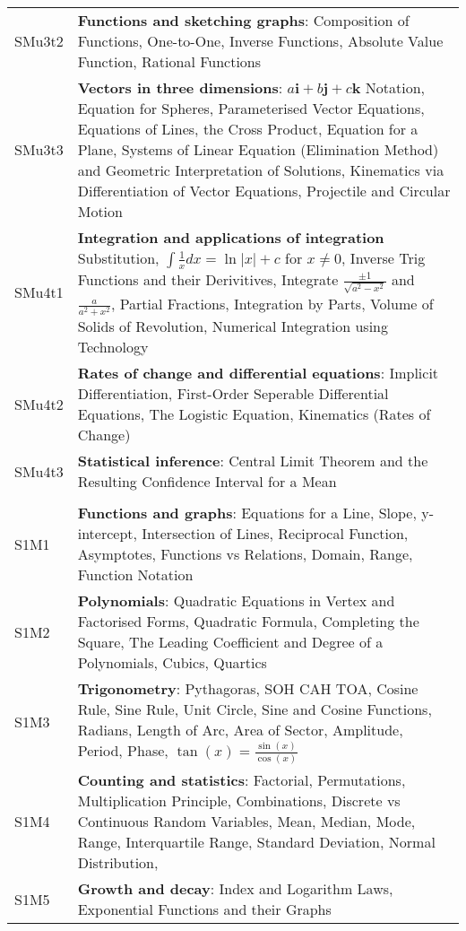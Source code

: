 \documentclass[varwidth=144mm, 12pt]{standalone}
\begin{document}
\begin{longtable}{lp{}}
SMu3t2 & \textbf{Functions and sketching graphs}: Composition of Functions, One-to-One, Inverse Functions, Absolute Value Function, Rational Functions \\
SMu3t3 & \textbf{Vectors in three dimensions}: $a\textbf{i} + b\textbf{j} + c\textbf{k}$ Notation, Equation for Spheres, Parameterised Vector Equations, Equations of Lines, the Cross Product, Equation for a Plane, Systems of Linear Equation (Elimination Method) and Geometric Interpretation of Solutions, Kinematics via Differentiation of Vector Equations, Projectile and Circular Motion \\
SMu4t1 & \textbf{Integration and applications of integration} Substitution, $\int{\frac{1}{x}dx} = \ln{|x|} + c$ for $x \neq 0$, Inverse Trig Functions and their Derivitives, Integrate $\frac{\pm1}{\sqrt{a^2-x^2}}$ and $\frac{a}{a^2 + x^2}$, Partial Fractions, Integration by Parts, Volume of Solids of Revolution, Numerical Integration using Technology \\
SMu4t2 & \textbf{Rates of change and differential equations}: Implicit Differentiation, First-Order Seperable Differential Equations, The Logistic Equation, Kinematics (Rates of Change) \\
SMu4t3 & \textbf{Statistical inference}: Central Limit Theorem and the Resulting Confidence Interval for a Mean \\
& \\
S1M1 & \textbf{Functions and graphs}: Equations for a Line, Slope, y-intercept, Intersection of Lines, Reciprocal Function, Asymptotes, Functions vs Relations, Domain, Range, Function Notation \\
S1M2 & \textbf{Polynomials}: Quadratic Equations in Vertex and Factorised Forms, Quadratic Formula, Completing the Square, The Leading Coefficient and Degree of a Polynomials, Cubics, Quartics\\
S1M3 & \textbf{Trigonometry}: Pythagoras, SOH CAH TOA, Cosine Rule, Sine Rule, Unit Circle, Sine and Cosine Functions, Radians, Length of Arc, Area of Sector, Amplitude, Period, Phase, $\tan(x) = \frac{\sin(x)}{\cos(x)}$ \\
S1M4 & \textbf{Counting and statistics}: Factorial, Permutations, Multiplication Principle, Combinations, Discrete vs Continuous Random Variables, Mean, Median, Mode, Range, Interquartile Range, Standard Deviation, Normal Distribution, \\
S1M5 & \textbf{Growth and decay}: Index and Logarithm Laws, Exponential Functions and their Graphs \\

\end{longtable}
\end{document}
